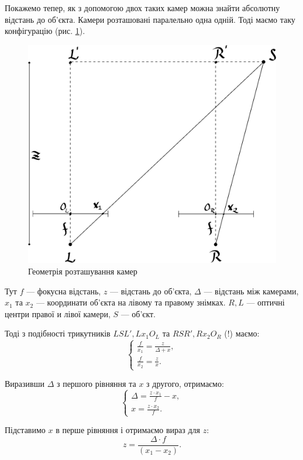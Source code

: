 Покажемо тепер, як з допомогою двох таких камер можна знайти абсолютну відстань до об'єкта. Камери розташовані паралельно одна одній.
Тоді маємо таку конфігурацію (рис. \ref{geometry}).%
\begin{figure}[!htb]
	\centering
	\includegraphics[scale = 0.6]{geometry.pdf}
	\caption{Геометрія розташування камер}
	\label{geometry}
\end{figure}
Тут $f$ --- фокусна відстань, $z$ --- відстань до об'єкта, $\Delta$ --- відстань між камерами, $x_1$ та $x_2$ --- координати об'єкта на лівому та правому знімках. $R, L$ --- оптичні центри правої и лівої камери, $S$ --- об'єкт.

Тоді з подібності трикутників $LSL' , Lx_1O_L$ та $RSR' , Rx_2O_R$ (!) маємо:
$$\begin{cases} \frac{f}{x_1} = \frac{z}{\Delta + x} , \\ \frac{f}{x_2} = \frac{z}{x} . \end{cases}$$
	
Виразивши $\Delta$ з першого рівняння та $x$ з другого, отримаємо:
$$\begin{cases} \Delta = \frac{z \cdot x_1}{f} - x , \\ x = \frac{z \cdot x_2}{f} . \end{cases}$$
	
Підставимо $x$ в перше рівняння і отримаємо вираз для $z$:
$$ z = \frac{\Delta \cdot f}{(x_1 - x_2)} .$$
	
